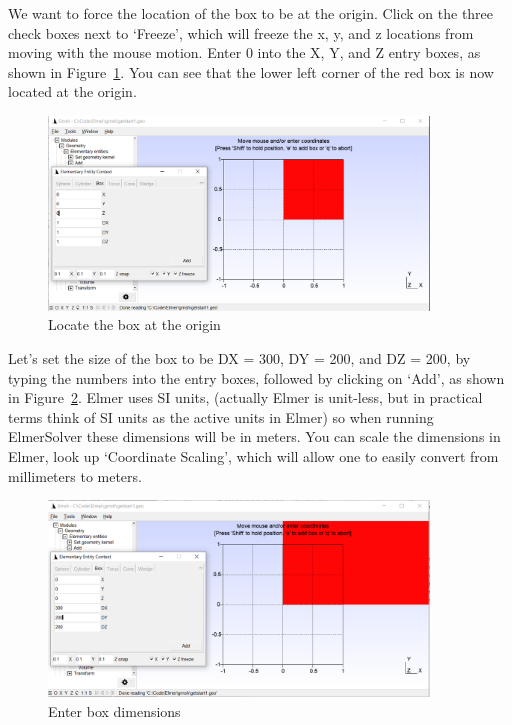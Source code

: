 We want to force the location of the box to be at the origin.  Click on the three check boxes next to `Freeze', which will freeze the x, y, and z locations from moving with the mouse motion.  Enter 0 into the X, Y, and Z entry boxes, as shown in Figure~\ref{fg:gmsh-10}.  You can see that the lower left corner of the red box is now located at the origin.

\begin{figure}[H]
\centering
\includegraphics[width=0.9\textwidth]{gmsh-10}
\caption{Locate the box at the origin}\label{fg:gmsh-10}
\end{figure}

Let's set the size of the box to be DX = 300, DY = 200, and DZ = 200, by typing the numbers into the entry boxes, followed by clicking on `Add', as shown in Figure~\ref{fg:gmsh-11}.  Elmer uses SI units, (actually Elmer is unit-less, but in practical terms think of SI units as the active units in Elmer) so when running ElmerSolver these dimensions will be in meters.  You can scale the dimensions in Elmer, look up `Coordinate Scaling', which will allow one to easily convert from millimeters to meters.

\begin{figure}[H]
\centering
\includegraphics[width=0.9\textwidth]{gmsh-11}
\caption{Enter box dimensions}\label{fg:gmsh-11}
\end{figure}

